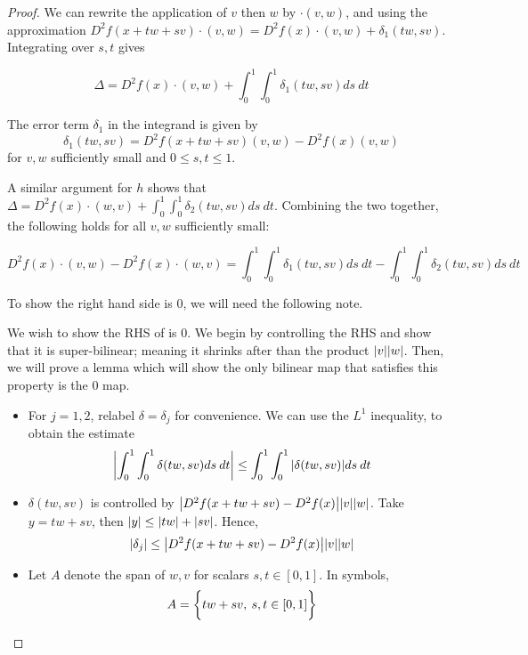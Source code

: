 \documentclass[../main-manifolds.tex]{subfiles}
\begin{document}
\begin{proof}

    We can rewrite the application of $v$ then $w$ by $\cdot (v,w)$, and using the approximation $D^2f(x+tw+sv)\cdot(v,w) = D^2f(x)\cdot(v,w)+\delta_1(tw,sv)$. Integrating over $s,t$ gives

    \[
        \Delta = D^2f(x)\cdot(v,w) + \int_0^1\int_0^1 \delta_1(tw,sv) ds\: dt
    \]

    \begin{note}
        The error term $\delta_1$ in the integrand is given by
        \[
            \delta_1(tw,sv) = D^2f(x + tw + sv)(v,w) - D^2f(x)(v,w)
        \]
        for $v,w$ sufficiently small and $0 \leq s,t\leq 1$.
    \end{note}

    A similar argument for $h$ shows that $\Delta = D^2f(x)\cdot(w,v) + \int_0^1\int_0^1 \delta_2(tw,sv)ds\: dt$. Combining the two together, the following holds for all $v,w$ sufficiently small:

    \begin{equation}\label{second-derivative-lie-bracket}
        D^2f(x)\cdot (v,w) - D^2f(x)\cdot (w,v) = \int_0^1\int_0^1 \delta_1(tw,sv)ds\: dt - \int_0^1\int_0^1 \delta_2(tw,sv)ds\: dt
    \end{equation}

    To show the right hand side is $0$, we will need the following note. 

    \begin{note}
    We wish to show the RHS of  is $0$. We begin by controlling the RHS and show that it is super-bilinear; meaning it shrinks after than the product $\abs{v}\abs{w}$. Then, we will prove a lemma which will show the only bilinear map that satisfies this property is the $0$ map.

    \begin{itemize}
        \item For $j=1,2$, relabel $\delta = \delta_j$ for convenience. We can use the $L^1$ inequality, to obtain the estimate
        \begin{equation}\label{second-derivative-step2}
            \abs{ \int_0^1\int_0^1\delta(tw,sv)ds\: dt} \leq \int_0^1\int_0^1\abs{\delta(tw,sv)}ds\: dt
        \end{equation}
        \item $\delta(tw,sv)$ is controlled by $\abs{D^2f(x + tw + sv) - D^2f(x)}\abs{v}\abs{w}$. Take $y = tw+sv$, then $\abs{y} \leq \abs{tw} + \abs{sv}$. Hence,
        \begin{equation}\label{second-derivative-control-on-rhs}
            \vert\delta_j\vert\leq\abs{D^2 f(x + tw + sv) - D^2f(x)}\abs{v}\abs{w}
        \end{equation}
        \item Let $A$ denote the span of $w,v$ for scalars $s,t\in[0,1]$. In symbols,
        \[
            A = \biggl\{{tw+sv,\: s,t\in [0,1]}\biggr\}
        \]


\end{itemize}
\end{note}
\end{proof}
\end{document}
